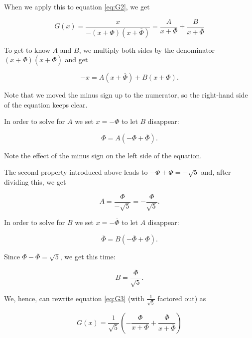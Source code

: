 \documentclass[tikz]{scrreprt}
\begin{document}
When we apply this to equation \ref{eq:G2},
we get

\begin{equation}\label{eq:G3}
G(x) = \frac{x}{-(x+\Phi)(x+\overline{\Phi})} = 
\frac{A}{x+\Phi} + \frac{B}{x+\overline{\Phi}}
\end{equation}

To get to know $A$ and $B$, we multiply both sides
by the denominator $(x+\Phi)(x+\overline{\Phi})$
and get

\begin{equation}
-x = A(x+\overline{\Phi}) + B(x+\Phi).
\end{equation}

Note that we moved the minus sign up to the numerator,
so the right-hand side of the equation keeps clear.

In order to solve for $A$ we set $x=-\Phi$ to let $B$ disappear:

\begin{equation}
\Phi = A(-\Phi+\overline{\Phi}).
\end{equation}

Note the effect of the minus sign on the left side of the equation.

The second property introduced above leads to
$-\Phi+\overline{\Phi} = -\sqrt{5}$ and,
after dividing this, we get

\begin{equation}
A = \frac{\Phi}{-\sqrt{5}} = -\frac{\Phi}{\sqrt{5}}.
\end{equation}

In order to solve for $B$ we set $x=-\overline{\Phi}$ to let $A$ disappear:

\begin{equation}
\overline{\Phi} = B(-\overline{\Phi}+\Phi).
\end{equation}

Since $\Phi-\overline{\Phi} = \sqrt{5}$, we get this time:

\begin{equation}
B = \frac{\overline{\Phi}}{\sqrt{5}}.
\end{equation}

We, hence, can rewrite equation \ref{eq:G3} 
(with $\frac{1}{\sqrt{5}}$ factored out) as

\begin{equation}\label{eq:G4}
G(x) = \frac{1}{\sqrt{5}}\left(
       -\frac{\Phi}{x+\Phi} + 
       \frac{\overline{\Phi}}{x+\overline{\Phi}}\right)
\end{equation}
\end{document}

